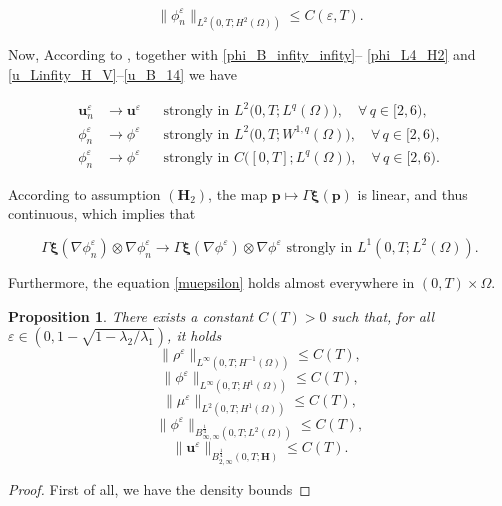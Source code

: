 \documentclass[11pt]{article}
\def\bq{\begin{equation}}
\def\eq{\end{equation}}
\def\bfH{\mathbf{H}}
\def\bfu{\mathbf{u}}
\def\bfxi{\boldsymbol{\xi}}
\def\bq{\begin{equation}}
\def\eq{\end{equation}}
\def\Om{\Omega}
\newtheorem{proposition}[theorem]{Proposition}
\begin{document}
{{\bq
\|\phi_n^{\varepsilon}\|_{L^2(0,T;H^2(\Om))} \le C(\varepsilon,T).\label{phi_L4_H2}
\eq

Now, According to \cite[Lemma 3.1]{giorgini2020weak}, together with \eqref{phi_B_infity_infity}-- \eqref{phi_L4_H2} and \eqref{u_Linfity_H_V}--\eqref{u_B_14} we have 

\begin{align}
\bfu_n^{\varepsilon} &\to \bfu^{\varepsilon} 
&& \text{strongly in } L^2\bigl(0,T; L^q(\Omega)\bigr),
\quad \forall\, q \in [2,6),  \\[0.5em]
\phi_n^{\varepsilon} &\to \phi^{\varepsilon} 
&& \text{strongly in } L^2\bigl(0,T; W^{1,q}(\Omega)\bigr),
\quad \forall\, q \in [2,6), \\[0.5em]
\phi_n^{\varepsilon} &\to \phi^{\varepsilon} 
&& \text{strongly in } C\bigl([0,T]; L^q(\Omega)\bigr),
\quad \forall\, q \in [2,6).
\end{align}

}

{  %
According to assumption \((\bfH_2)\), the map \( \mathbf{p} \mapsto \Gamma \bfxi(\mathbf{p}) \) is linear, and thus continuous, which implies that 

\bq
\Gamma \bfxi(\nabla \phi_n^{\varepsilon}) \otimes \nabla \phi_n^{\varepsilon} \rightarrow \Gamma \bfxi(\nabla \phi^{\varepsilon}) \otimes \nabla \phi^{\varepsilon}  \text{ strongly in  }  L^1(0,T; L^2(\Omega)).\label{pass_limit}
\eq 
}

{ 

Furthermore, the equation \eqref{muepsilon} holds almost everywhere in $(0,T)\times\Om$.}


\begin{proposition}
\label{prop12}
There exists a constant $C(T) > 0$ such that, for all $\varepsilon\in (0,1 - \sqrt{1-{\lambda_2}/{\lambda_1}})$, it holds
\bq
\|\rho^{\varepsilon}\|_{L^{\infty}(0,T;H^{-1}(\Omega))} \leq C(T),\label{rho_f}
\eq 
\bq\|\phi^{\varepsilon}\|_{L^{\infty}(0,T;H^1(\Omega))} \leq C(T) ,\label{phi_L2H1}
\eq
\bq
{ 
\|\mu^{\varepsilon}\|_{L^{2}(0,T;H^1(\Omega))} \leq C(T),\label{mu_L2H1}}
\eq
\bq
\|\phi^{\varepsilon}\|_{B_{\infty,\infty}^{\frac{1}{4}}(0,T;L^2(\Omega))} \leq C(T),\label{phi_f}
\eq
\bq
\|\bfu^{\varepsilon}\|_{B_{2,\infty}^{\frac{1}{4}}(0,T;\bfH)} \leq C(T).\label{u_f}
\eq
\end{proposition}
\begin{proof}
First of all, we have the density bounds


\end{proof}}
\end{document}
